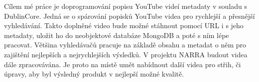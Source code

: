 \par Cílem mé práce je doprogramování popisu YouTube videí metadaty v souladu s DublinCore. Jedná se o spárování popisků YouTube videa pro rychlejší a přesnější vyhledávání. Takto doplněné video bude možné stáhnout pomocí URL i s jeho metadaty, uložit ho do neobjektové databáze MongoDB a poté s ním lépe pracovat. Většina vyhledávačů pracuje na základě obsahu a metadat o něm pro zajištění nejlepších a nejrychlejších výsledků. V projektu NARRA budout videa dále zpracovávána. Je proto na místě umět nabídnout další videa pro střih, či úpravy, aby byl výsledný produkt v nejlepší možné kvalitě.